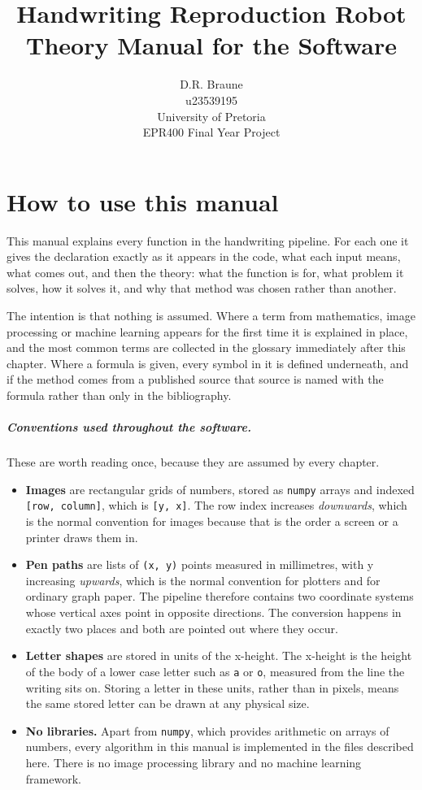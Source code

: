 \documentclass[11pt,a4paper,oneside]{report}
\title{\Huge Handwriting Reproduction Robot\\[6pt]
       \Large Theory Manual for the Software}
\author{D.R. Braune \\ u23539195 \\[4pt]
        University of Pretoria \\ EPR400 Final Year Project}
\date{}
\begin{document}
\maketitle
\tableofcontents

\chapter{How to use this manual}

This manual explains every function in the handwriting pipeline. For each one
it gives the declaration exactly as it appears in the code, what each input
means, what comes out, and then the theory: what the function is for, what
problem it solves, how it solves it, and why that method was chosen rather
than another.

The intention is that nothing is assumed. Where a term from mathematics,
image processing or machine learning appears for the first time it is
explained in place, and the most common terms are collected in the glossary
immediately after this chapter. Where a formula is given, every symbol in it
is defined underneath, and if the method comes from a published source that
source is named with the formula rather than only in the bibliography.

\paragraph{Conventions used throughout the software.}
These are worth reading once, because they are assumed by every chapter.

\begin{itemize}\setlength\itemsep{2pt}
  \item \textbf{Images} are rectangular grids of numbers, stored as
        \texttt{numpy} arrays and indexed \texttt{[row, column]}, which is
        \texttt{[y, x]}. The row index increases \emph{downwards}, which is
        the normal convention for images because that is the order a screen
        or a printer draws them in.
  \item \textbf{Pen paths} are lists of \texttt{(x, y)} points measured in
        millimetres, with y increasing \emph{upwards}, which is the normal
        convention for plotters and for ordinary graph paper. The pipeline
        therefore contains two coordinate systems whose vertical axes point
        in opposite directions. The conversion happens in exactly two places
        and both are pointed out where they occur.
  \item \textbf{Letter shapes} are stored in units of the x-height. The
        x-height is the height of the body of a lower case letter such as
        \texttt{a} or \texttt{o}, measured from the line the writing sits on.
        Storing a letter in these units, rather than in pixels, means the
        same stored letter can be drawn at any physical size.
  \item \textbf{No libraries.} Apart from \texttt{numpy}, which provides
        arithmetic on arrays of numbers, every algorithm in this manual is
        implemented in the files described here. There is no image
        processing library and no machine learning framework.
\end{itemize}
\end{document}
